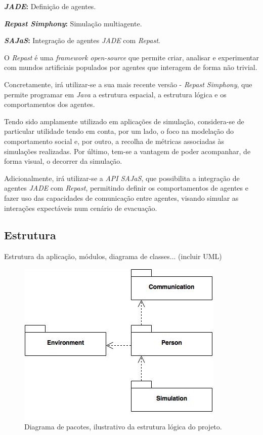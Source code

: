 \documentclass[12pt]{article}
\begin{document}
\begin{titlepage}
\textbf{\textit{JADE}:} Definição de agentes.

\textbf{\textit{Repast Simphony}:} Simulação multiagente.

\textbf{\textit{SAJaS}:} Integração de agentes \textit{JADE} com \textit{Repast}.
\newline

O \textit{Repast} é uma \textit{framework open-source} que permite criar, analisar e experimentar com mundos artificiais populados por agentes que interagem de forma não trivial.

Concretamente, irá utilizar-se a sua mais recente versão - \textit{Repast Simphony}, que permite programar em \textit{Java} a estrutura espacial, a estrutura lógica e os comportamentos dos agentes.

Tendo sido amplamente utilizado em aplicações de simulação, considera-se de particular utilidade tendo em conta, por um lado, o foco na modelação do comportamento social e, por outro, a recolha de métricas associadas às simulações realizadas. Por último, tem-se a vantagem de poder acompanhar, de forma visual, o decorrer da simulação.

Adicionalmente, irá utilizar-se a \textit{API SAJaS}, que possibilita a integração de agentes \textit{JADE} com \textit{Repast}, permitindo definir os comportamentos de agentes e fazer uso das capacidades de comunicação entre agentes, visando simular as interações expectáveis num cenário de evacuação.

\subsection{Estrutura}

Estrutura da aplicação, módulos, diagrama de classes...
(incluir UML)

\begin{figure}[H]
	\centering
	\includegraphics[scale=0.5]{packages.jpg}
	\caption{Diagrama de pacotes, ilustrativo da estrutura lógica do projeto.}
	\label{uml}
\end{figure}


\end{titlepage}
\end{document}

